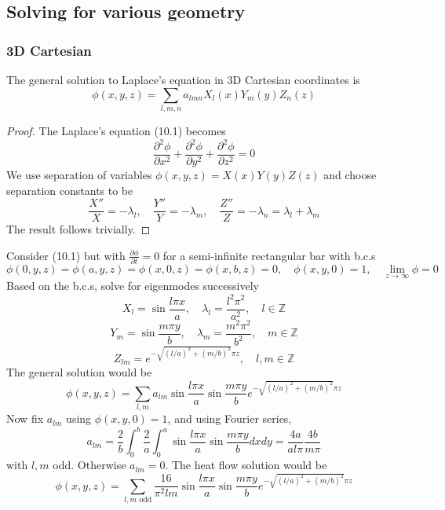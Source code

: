 \documentclass[a4paper]{article}
\begin{document}
\subsection{Solving for various geometry}
\subsubsection{3D Cartesian}
\begin{prop}
The general solution to Laplace's equation in 3D Cartesian coordinates is
\begin{equation}
    \phi(x,y,z)=\sum_{l,m,n}a_{lmn}X_l(x)Y_m(y)Z_n(z)\tag{10.2}
\end{equation}
\end{prop}
\begin{proof}
The Laplace's equation (10.1) becomes
\begin{equation}
    \frac{\partial^2\phi}{\partial x^2}+\frac{\partial^2\phi}{\partial y^2}+\frac{\partial^2\phi}{\partial z^2}=0\tag{10.3}
\end{equation}
We use separation of variables $\phi(x,y,z)=X(x)Y(y)Z(z)$ and choose separation constants to be
\begin{equation}
    \frac{X''}{X}=-\lambda_l,\quad\frac{Y''}{Y}=-\lambda_m,\quad\frac{Z''}{Z}=-\lambda_n=\lambda_l+\lambda_m\tag{10.4}
\end{equation}
The result follows trivially.
\end{proof}
\begin{eg}
Consider (10.1) but with $\frac{\partial\phi}{\partial t}=0$ for a semi-infinite rectangular bar with b.c.s
$$\phi(0,y,z)=\phi(a,y,z)=\phi(x,0,z)=\phi(x,b,z)=0,\quad\phi(x,y,0)=1,\quad\lim_{z\rightarrow\infty}\phi=0$$
Based on the b.c.s, solve for eigenmodes successively
$$X_l=\sin\frac{l\pi x}{a},\quad\lambda_l=\frac{l^2\pi^2}{a^2},\quad l\in\mathbb{Z}$$
$$Y_m=\sin\frac{m\pi y}{b},\quad\lambda_m=\frac{m^2\pi^2}{b^2},\quad m\in\mathbb{Z}$$
$$Z_{lm}=e^{-\sqrt{(l/a)^2+(m/b)^2}\pi z},\quad l,m\in\mathbb{Z}$$
The general solution would be
$$\phi(x,y,z)=\sum_{l,m}a_{lm}\sin\frac{l\pi x}{a}\sin\frac{m\pi y}{b}e^{-\sqrt{(l/a)^2+(m/b)^2}\pi z}$$
Now fix $a_{lm}$ using $\phi(x,y,0)=1$, and using Fourier series,
$$a_{lm}=\frac{2}{b}\int_0^b\frac{2}{a}\int_0^a\sin\frac{l\pi x}{a}\sin\frac{m\pi y}{b}dxdy=\frac{4a}{al\pi}\frac{4b}{m\pi}$$
with $l,m$ odd. Otherwise $a_{lm}=0$. The heat flow solution would be
$$\phi(x,y,z)=\sum_{l,m\text{ odd}}\frac{16}{\pi^2lm}\sin\frac{l\pi x}{a}\sin\frac{m\pi y}{b}e^{-\sqrt{(l/a)^2+(m/b)^2}\pi z}$$
\end{eg}
\end{document}
